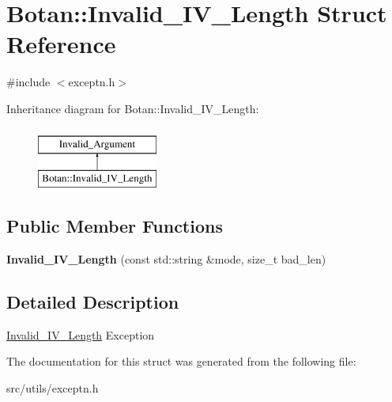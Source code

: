 \hypertarget{structBotan_1_1Invalid__IV__Length}{\section{Botan\-:\-:Invalid\-\_\-\-I\-V\-\_\-\-Length Struct Reference}
\label{structBotan_1_1Invalid__IV__Length}
}


{\ttfamily \#include $<$exceptn.\-h$>$}

Inheritance diagram for Botan\-:\-:Invalid\-\_\-\-I\-V\-\_\-\-Length\-:\begin{figure}[H]
\begin{center}
\leavevmode
\includegraphics[height=2.000000cm]{structBotan_1_1Invalid__IV__Length}
\end{center}
\end{figure}
\subsection*{Public Member Functions}
\begin{DoxyCompactItemize}
\item 
\hypertarget{structBotan_1_1Invalid__IV__Length_aa5516da99a13b6144bd9d0872ab8a7fb}{{\bfseries Invalid\-\_\-\-I\-V\-\_\-\-Length} (const std\-::string \&mode, size\-\_\-t bad\-\_\-len)}\label{structBotan_1_1Invalid__IV__Length_aa5516da99a13b6144bd9d0872ab8a7fb}

\end{DoxyCompactItemize}


\subsection{Detailed Description}
\hyperlink{structBotan_1_1Invalid__IV__Length}{Invalid\-\_\-\-I\-V\-\_\-\-Length} Exception 

The documentation for this struct was generated from the following file\-:\begin{DoxyCompactItemize}
\item 
src/utils/exceptn.\-h\end{DoxyCompactItemize}
